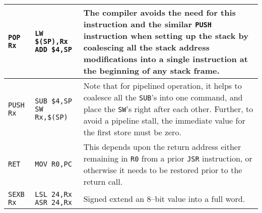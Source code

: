 \documentclass{gqtekspec}
\begin{document}
\begin{table}\begin{center}
\begin{tabular}{p{1.0in}p{1.5in}p{3.2in}}\\\hline
{\tt POP Rx }
	& \parbox[t]{1.5in}{\tt LW \$(SP),Rx \\ ADD \$4,SP}
	& The compiler avoids the need for this instruction and the similar
	{\tt PUSH} instruction when setting up the stack by coalescing all
	the stack address modifications into a single instruction at the
	beginning of any stack frame.\\\hline
{\tt PUSH Rx}
	& \parbox[t]{1.5in}{\hbox{\tt SUB \$4,SP} 
	\hbox{\tt SW Rx,\$(SP)}}
	& Note that for pipelined operation, it helps to coalesce all the
	{\tt SUB}'s into one command, and place the {\tt SW}'s right
	after each other.  Further, to avoid a pipeline stall, the
	immediate value for the first store must be zero.
	\\\hline
%
{\tt RET} & {\tt MOV R0,PC}
	& This depends upon the return address either remaining in {\tt R0}
	from a prior {\tt JSR} instruction, or otherwise it needs to be
	restored prior to the return call.  \\\hline
{\tt SEXB Rx }
	& \parbox[t]{1.5in}{\tt LSL 24,Rx \\ ASR 24,Rx}
	& Signed extend an 8--bit value into a full word.\\\hline

\end{tabular}
\end{center}
\end{table}
\end{document}
